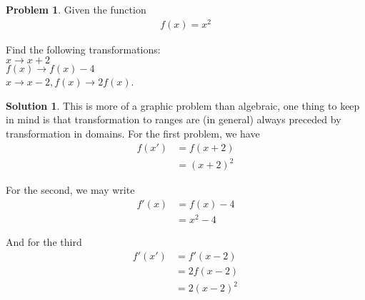 \documentclass[a4paper]{article}
\theoremstyle{definition}
\newtheorem{problem}{Problem}[section]
\newtheorem*{solution}{Solution}
\begin{document}
\begin{problem}
Given the function
\begin{align*}
f(x) = x^2
\end{align*}


Find the following transformations: \\ \(x \to x+2\)\\ \(f(x) \to f(x)-4\)\\ \(x \to x-2, f(x) \to 2f(x)\).
\end{problem}
\begin{solution}
This is more of a graphic problem than algebraic, one thing to keep in mind is that transformation to ranges are (in general) always preceded by transformation in domains. For the first problem, we have
\begin{align*}
f(x') &= f(x+2) \\
    &=(x+2)^2
\end{align*}


For the second, we may write
\begin{align*}
f'(x) &= f(x) - 4 \\
    &= x^2 -4
\end{align*}


And for the third 
\begin{align*}
f'(x') &= f'(x-2) \\
    &= 2f(x-2) \\
    &= 2(x-2)^2
\end{align*}
\end{solution}
\end{document}
